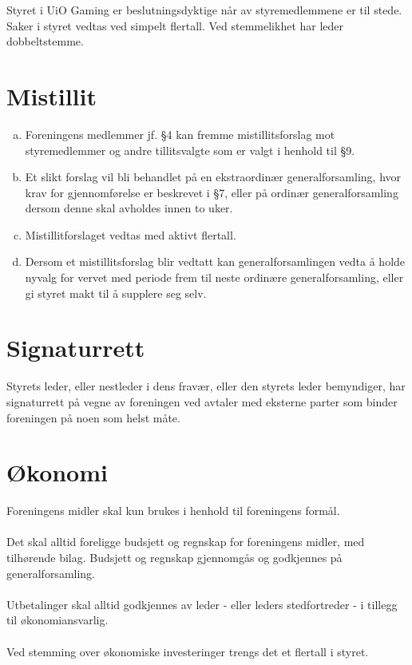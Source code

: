 \documentclass[12pt,a4paper,norsk]{article}
\begin{document}
Styret i UiO Gaming er beslutningsdyktige når  av styremedlemmene er til stede. Saker i styret vedtas ved simpelt flertall. Ved stemmelikhet har leder dobbeltstemme.



\section{Mistillit}

\begin{enumerate}[a)]
    \item Foreningens medlemmer jf. §4 kan fremme mistillitsforslag mot styremedlemmer og andre tillitsvalgte som er valgt i henhold til §9.
    \item Et slikt forslag vil bli behandlet på en ekstraordinær generalforsamling, hvor krav for gjennomførelse er beskrevet i §7, eller på ordinær generalforsamling dersom denne skal avholdes innen to uker.
    \item Mistillitforslaget vedtas med  aktivt flertall.
    \item Dersom et mistillitsforslag blir vedtatt kan generalforsamlingen vedta å holde nyvalg for vervet med periode frem til neste ordinære generalforsamling, eller gi styret makt til å supplere seg selv.
\end{enumerate}



\section{Signaturrett}

Styrets leder, eller nestleder i dens fravær, eller den styrets leder bemyndiger, har signaturrett på vegne av foreningen ved avtaler med eksterne parter som binder foreningen på noen som helst måte.



\section{Økonomi}

Foreningens midler skal kun brukes i henhold til foreningens formål.
\\
\\
Det skal alltid foreligge budsjett og regnskap for foreningens midler, med tilhørende bilag. Budsjett og regnskap gjennomgås og godkjennes på generalforsamling.
\\
\\
Utbetalinger skal alltid godkjennes av leder - eller leders stedfortreder - i tillegg til økonomiansvarlig.
\\
\\
Ved stemming over økonomiske investeringer trengs det et  flertall i styret.
\end{document}
